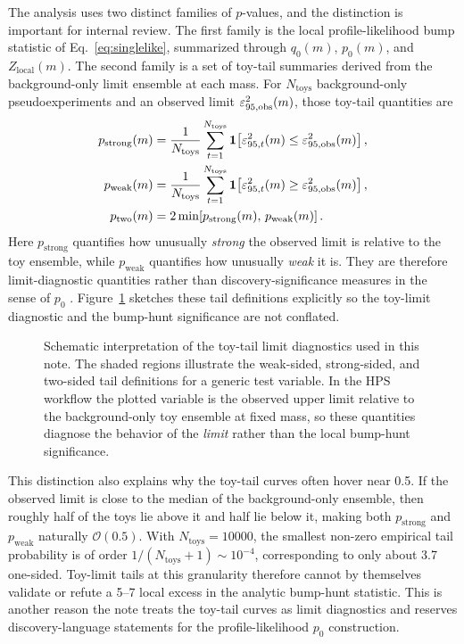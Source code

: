 The analysis uses two distinct families of $p$-values, and the distinction is
important for internal review. The first family is the local profile-likelihood bump
statistic of Eq.~\eqref{eq:singlelike}, summarized through $q_0(m)$, $p_0(m)$, and
$Z_{\mathrm{local}}(m)$. The second family is a set of toy-tail summaries derived from
the background-only \CLs{} limit ensemble at each mass. For $N_{\mathrm{toys}}$
background-only pseudoexperiments and an observed limit
$\varepsilon^2_{95,\mathrm{obs}}(m)$, those toy-tail quantities are
\begin{align}
p_{\mathrm{strong}}(m)
&=
\frac{1}{N_{\mathrm{toys}}}
\sum_{t=1}^{N_{\mathrm{toys}}}
\mathbf{1}\!\left[
\varepsilon^2_{95,t}(m)\le \varepsilon^2_{95,\mathrm{obs}}(m)
\right], \\
p_{\mathrm{weak}}(m)
&=
\frac{1}{N_{\mathrm{toys}}}
\sum_{t=1}^{N_{\mathrm{toys}}}
\mathbf{1}\!\left[
\varepsilon^2_{95,t}(m)\ge \varepsilon^2_{95,\mathrm{obs}}(m)
\right], \\
p_{\mathrm{two}}(m)
&=
2\min\!\left[p_{\mathrm{strong}}(m),\,p_{\mathrm{weak}}(m)\right].
\end{align}
Here $p_{\mathrm{strong}}$ quantifies how unusually \emph{strong} the observed limit
is relative to the toy ensemble, while $p_{\mathrm{weak}}$ quantifies how unusually
\emph{weak} it is. They are therefore limit-diagnostic quantities rather than
discovery-significance measures in the sense of $p_0$ \cite{Junk1999,Read2002,Cowan2011}.
Figure~\ref{fig:pvalue-tail-schematic} sketches these tail definitions explicitly so
the toy-limit diagnostic and the bump-hunt significance are not conflated.

\begin{figure}[H]
\centering
{}
\caption{Schematic interpretation of the toy-tail limit diagnostics used in this note.
The shaded regions illustrate the weak-sided, strong-sided, and two-sided tail
definitions for a generic test variable. In the HPS workflow the plotted variable is
the observed \CLs{} upper limit relative to the background-only toy ensemble at fixed
mass, so these quantities diagnose the behavior of the \emph{limit} rather than the
local bump-hunt significance.}
\label{fig:pvalue-tail-schematic}
\end{figure}

This distinction also explains why the toy-tail curves often hover near 0.5. If the
observed limit is close to the median of the background-only ensemble, then roughly
half of the toys lie above it and half lie below it, making both
$p_{\mathrm{strong}}$ and $p_{\mathrm{weak}}$ naturally $\mathcal{O}(0.5)$. With
$N_{\mathrm{toys}}=\num{10000}$, the smallest non-zero empirical tail probability is
of order $1/(N_{\mathrm{toys}}+1)\sim 10^{-4}$, corresponding to only about
\SI{3.7}{\sigma} one-sided. Toy-limit tails at this granularity therefore cannot by
themselves validate or refute a \SIrange{5}{7}{\sigma} local excess in the analytic
bump-hunt statistic. This is another reason the note treats the toy-tail curves as
limit diagnostics and reserves discovery-language statements for the profile-likelihood
$p_0$ construction.

